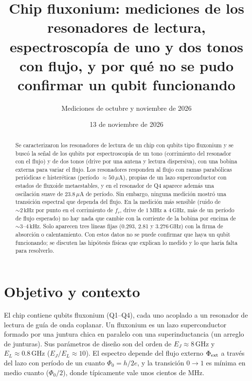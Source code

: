 \documentclass[11pt,a4paper]{article}
\title{Chip fluxonium: mediciones de los resonadores de lectura,\\
espectroscopía de uno y dos tonos con flujo, y por qué no se pudo\\
confirmar un qubit funcionando}
\author{Mediciones de octubre y noviembre de 2026}
\date{13 de noviembre de 2026}
\newcommand{\uA}{\,\mu\mathrm{A}}
\newcommand{\GHz}{\,\mathrm{GHz}}
\newcommand{\MHz}{\,\mathrm{MHz}}
\newcommand{\kHz}{\,\mathrm{kHz}}
\newcommand{\fr}{f_r}
\begin{document}
\maketitle

\begin{abstract}
\noindent
Se caracterizaron los resonadores de lectura de un chip con qubits tipo fluxonium y se buscó la señal de los
qubits por espectroscopía de un tono (corrimiento del resonador con el flujo) y de dos tonos (drive por una antena
y lectura dispersiva), con una bobina externa para variar el flujo. Los resonadores responden al flujo con ramas
parabólicas periódicas e histeréticas (período $\approx 50\uA$), propias de un lazo superconductor con estados de
fluxoide metaestables, y en el resonador de Q4 aparece además una oscilación suave de $23.8\uA$ de período. Sin
embargo, ninguna medición mostró una transición espectral que dependa del flujo. En la medición más sensible
(ruido de $\sim 2\kHz$ por punto en el corrimiento de $\fr$, drive de $1\MHz$ a $4\GHz$, más de un período de flujo
esperado) no hay nada que cambie con la corriente de la bobina por encima de $\sim 3$--$4\kHz$. Solo aparecen tres
líneas fijas (0.293, 2.81 y $3.276\GHz$) con la firma de absorción o calentamiento. Con estos datos no se puede
confirmar que haya un qubit funcionando; se discuten las hipótesis físicas que explican lo medido y lo que haría
falta para resolverlo.
\end{abstract}

\tableofcontents
\newpage

\section{Objetivo y contexto}

El chip contiene qubits fluxonium (Q1--Q4), cada uno acoplado a un resonador de lectura de guía de onda coplanar.
Un fluxonium es un lazo superconductor formado por una juntura chica en paralelo con una superinductancia (un arreglo
de junturas). Sus parámetros de diseño son del orden de $E_J \approx 8\GHz$ y $E_L \approx 0.8\GHz$
($E_J/E_L \approx 10$). El espectro depende del flujo externo $\Phi_{\rm ext}$ a través del lazo con período de un
cuanto $\Phi_0 = h/2e$, y la transición $0\to1$ es mínima en medio cuanto ($\Phi_0/2$), donde típicamente vale unos
cientos de MHz.
\end{document}
